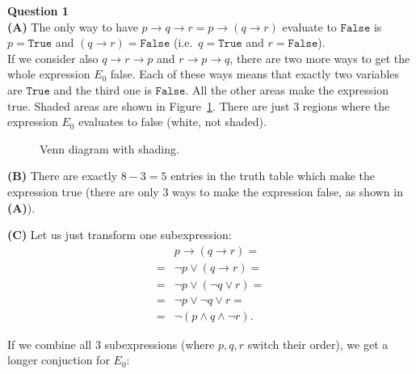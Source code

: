 \documentclass[jou]{apa6}
\begin{document}
\vspace{6pt}
{\bf Question 1}\\
{\bf (A)} The only way to have $p \rightarrow q \rightarrow r = p \rightarrow (q \rightarrow r)$ evaluate to 
$\mathtt{False}$ is $p = \mathtt{True}$ and $(q \rightarrow r) = \mathtt{False}$ (i.e.\ 
$q = \mathtt{True}$ and $r = \mathtt{False}$).\\
If we consider also $q \rightarrow r \rightarrow p$ and $r \rightarrow p \rightarrow q$, there are two 
more ways to get the whole expression $E_0$ false. Each of these ways means that exactly two variables
are $\mathtt{True}$ and the third one is $\mathtt{False}$. 
All the other areas make the expression true. Shaded areas are shown in Figure~\ref{fig:circles-shaded2}. There are just $3$ 
regions where the expression $E_0$ evaluates to false (white, not shaded). 

\begin{figure}[!htb]
\caption{\label{fig:circles-shaded2} Venn diagram with shading.}
\end{figure}



{\bf (B)} There are exactly $8-3 = 5$ entries in the truth table which make the expression true
(there are only $3$ ways to make the expression false, as shown in {\bf (A)}). 

{\bf (C)} Let us just transform one subexpression: 
\begin{align}
 & p \rightarrow (q \rightarrow r) = \nonumber \\
= & \neg p \vee (q \rightarrow r) = \nonumber \\
= & \neg p \vee (\neg q \vee r) = \nonumber \\
= & \neg p \vee \neg q \vee r  = \nonumber \\
= & \neg (p \wedge q \wedge \neg r). \nonumber
\end{align}

If we combine all $3$ subexpressions (where $p,q,r$ switch their order), we get 
a longer conjuction for $E_0$:
\end{document}
